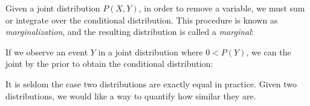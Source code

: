 \documentclass[11pt]{article}
\begin{document}
\begin{prooftree}
\end{prooftree}

%
%

\noindent Given a joint distribution $P(X, Y)$, in order to remove a variable, we must sum or integrate over the conditional distribution. This procedure is known as \textit{marginalization}, and the resulting distribution is called a \textit{marginal}:

\begin{prooftree}
\end{prooftree}

\noindent If we observe an event $Y$ in a joint distribution where $0 < P(Y)$, we can the joint by the prior to obtain the conditional distribution:

\begin{prooftree}
\end{prooftree}



    \noindent It is seldom the case two distributions are exactly equal in practice. Given two distributions, we would like a way to quantify how similar they are.
\end{document}
